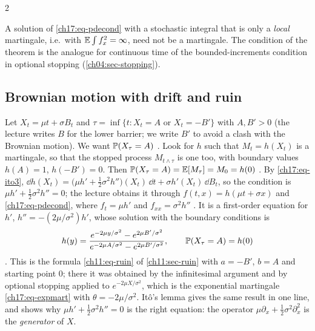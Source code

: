 \begin{paracol}{2}
\begin{remark}
A solution of \eqref{ch17:eq-pdecond} with a stochastic integral that is only a \emph{local} martingale, i.e.\ with $\mathbb{E}\int f_x^2=\infty$, need not be a martingale. The condition of the theorem
is the analogue for continuous time of the bounded-increments condition in optional stopping (\cref{ch04:sec-stopping}).
\end{remark}

\subsection{Brownian motion with drift and ruin}\label{ch17:sec-ruin}
Let $X_t=\mu t+\sigma B_t$ and $\tau=\inf\{t:X_t=A\text{ or }X_t=-B'\}$ with $A,B'>0$ (the lecture writes $B$ for the lower barrier; we write $B'$ to avoid a clash with the Brownian motion). We want $\mathbb{P}(X_\tau=A)$
. Look for $h$ such that $M_t=h(X_t)$ is a martingale, so that the stopped process $M_{t\wedge\tau}$ is one too, with boundary values $h(A)=1$, $h(-B')=0$. Then
$\mathbb{P}(X_\tau=A)=\mathbb{E}[M_\tau]=M_0=h(0)$ . By \eqref{ch17:eq-ito3}, $\dd h(X_t)=\bigl(\mu h'+\tfrac12\sigma^2h''\bigr)(X_t)\,\dd t+\sigma h'(X_t)\,\dd B_t$, so the condition
is $\mu h'+\tfrac12\sigma^2h''=0$; the lecture obtains it through $f(t,x)=h(\mu t+\sigma x)$ and \eqref{ch17:eq-pdecond}, where $f_t=\mu h'$ and $f_{xx}=\sigma^2h''$
. It is a first-order equation for $h'$, $h''=-(2\mu/\sigma^2)h'$, whose solution with the boundary conditions is
\[
  h(y)=\frac{e^{-2\mu y/\sigma^2}-e^{2\mu B'/\sigma^2}}{e^{-2\mu A/\sigma^2}-e^{2\mu B'/\sigma^2}},\qquad \mathbb{P}(X_\tau=A)=h(0)
\]
. This is the formula \eqref{ch11:eq-ruin} of \cref{ch11:sec-ruin} with $a=-B'$, $b=A$ and starting point $0$; there it was obtained by the infinitesimal argument and by
optional stopping applied to $e^{-2\mu X/\sigma^2}$, which is the exponential martingale \eqref{ch17:eq-expmart} with $\theta=-2\mu/\sigma^2$.
It\^o's lemma gives the same result in one line, and shows why $\mu h'+\tfrac12\sigma^2h''=0$ is the right equation: the operator $\mu\partial_x+\tfrac12\sigma^2\partial_x^2$ is the \emph{generator} of $X$.


\end{paracol}
